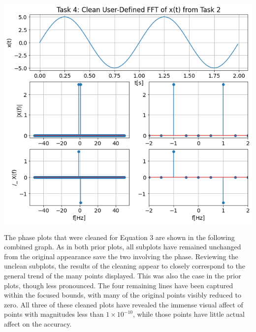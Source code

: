 \documentclass[12pt]{report}
\begin{document}
\begin{center}
	\includegraphics[scale = 0.37]{Lab 9 - Plots/Task4-2.png}\\[1.0 cm]
\end{center}

The phase plots that were cleaned for Equation 3 are shown in the following combined graph. As in both prior plots, all subplots have remained unchanged from the original appearance save the two involving the phase. Reviewing the unclean subplots, the results of the cleaning appear to closely correspond to the general trend of the many points displayed. This was also the case in the prior plots, though less pronounced. The four remaining lines have been captured within the focused bounds, with many of the original points visibly reduced to zero. All three of these cleaned plots have revealed the immense visual affect of points with magnitudes less than $ 1\times 10^{-10} $, while those points have little actual affect on the accuracy. \\
\end{document}
